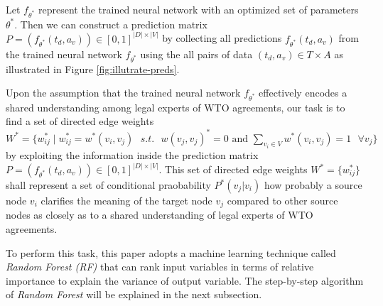 Let $f_{\theta^*}$ represent the trained neural network with an optimized set of parameters $\theta^*$. 
Then we can construct a prediction matrix $P = (f_{\theta^*}(t_d, a_v)) \in [0,1]^{{|D| \times |V|}}$  by collecting all predictions $f_{\theta^*}(t_d, a_v)$ from the trained neural network $f_{\theta^{*}}$ using the all pairs of data $(t_d,a_v) \in T \times A$ as illustrated in Figure \ref{fig:illutrate-preds}.

Upon the assumption that the trained neural network $f_{\theta^*}$ effectively encodes a shared understanding among legal experts of WTO agreements, our task is to find a set of directed edge weights $W^* = \{w^{*}_{ij} \mid w^{*}_{ij} = w^{*}(v_i, v_j) \text{ } s.t. \text{ } w(v_j, v_j)^{*} = 0 \text{ and } \sum_{v_i\in V}{w^{*}(v_i, v_j)} = 1 \text{ } \forall v_j \}$ %
by exploiting the information inside the prediction matrix $P = (f_{\theta^*}(t_d, a_v)) \in [0,1]^{{|D| \times |V|}}$. This set of directed edge weights $W^{*} = \{w^{*}_{ij}\}$ shall represent a set of conditional praobability $P^{*}(v_j|v_i)$ how probably a source node $v_i$ clarifies the meaning of the target node $v_j$ compared to other source nodes
as closely as to a shared understanding of legal experts of WTO agreements.

To perform this task, this paper adopts a machine learning technique called \textit{Random Forest (RF)} that can rank input variables in terms of relative importance to explain the variance of output variable. The step-by-step algorithm of \textit{Random Forest} will be explained in the next subsection.






